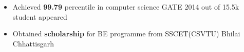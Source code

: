 \\[-0.8cm]\\
\begin{itemize}
	\item Achieved \textbf{99.79} percentile in computer science GATE 2014 out of 15.5k student appeared\\[-0.4cm]
	\item Obtained \textbf{scholarship} for BE programme from SSCET(CSVTU) Bhilai Chhattisgarh\\[-0.4cm]
\end{itemize}
